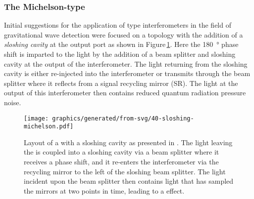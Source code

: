 \subsubsection{The Michelson-type \SM{}}
Initial suggestions for the application of \SM{} type interferometers in the field of gravitational wave detection were focused on a \FPMI{} topology with the addition of a \emph{sloshing cavity} at the output port \cite{Braginsky2000, Purdue2002} as shown in Figure\,\ref{fig:sloshing-michelson}. Here the \SI{180}{\degree} phase shift is imparted to the light by the addition of a beam splitter and sloshing cavity at the output of the interferometer. The light returning from the sloshing cavity is either re-injected into the interferometer or transmits through the beam splitter where it reflects from a signal recycling mirror (SR). The light at the output of this interferometer then contains reduced quantum radiation pressure noise.

\begin{figure}
  \centering
  \texttt{[image: graphics/generated/from-svg/40-sloshing-michelson.pdf]}
  \caption[Layout of a \FPMI{} with a sloshing cavity]{\label{fig:sloshing-michelson}Layout of a \FPMI{} with a sloshing cavity as presented in \cite{Purdue2002}. The light leaving the \FPMI{} is coupled into a sloshing cavity via a beam splitter where it receives a phase shift, and it re-enters the interferometer via the recycling mirror to the left of the sloshing beam splitter. The light incident upon the beam splitter then contains light that has sampled the mirrors at two points in time, leading to a \SM{} effect.}
\end{figure}

